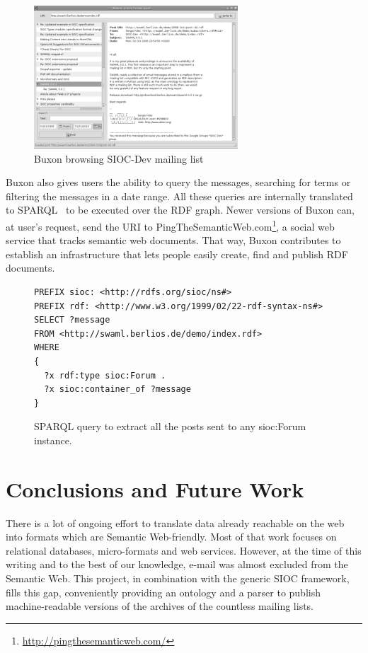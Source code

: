\documentclass{llncs}
\begin{document}
\begin{figure}[ht]
 \centering
 \includegraphics[bb=0 0 288 202]{images/buxon.png}
 \caption{\label{fig:buxon}Buxon browsing SIOC-Dev mailing list}
\end{figure}

Buxon also gives users the ability to query the messages, searching
for terms or filtering the messages in a date range. All these queries
are internally translated to SPARQL~\cite{SPARQLProtocol} to be executed
over the RDF graph. Newer versions of Buxon can, at user's request, send 
the URI to PingTheSemanticWeb.com\footnote{\url{http://pingthesemanticweb.com/}}, 
a social web service that tracks semantic web documents. That way, Buxon
contributes to establish an infrastructure that lets people easily create, 
find and publish RDF documents.

\begin{figure}[ht]
\lstset{language=SPARQL}
\begin{lstlisting}
PREFIX sioc: <http://rdfs.org/sioc/ns#>
PREFIX rdf: <http://www.w3.org/1999/02/22-rdf-syntax-ns#>
SELECT ?message
FROM <http://swaml.berlios.de/demo/index.rdf>
WHERE
{
  ?x rdf:type sioc:Forum .
  ?x sioc:container_of ?message
}
\end{lstlisting}
\caption{SPARQL query to extract all the posts sent to any \textsf{sioc:Forum} instance.}
\label{fig:sparqlquery}
\end{figure}

\section{\label{sec:conclusions}Conclusions and Future Work}

There is a lot of ongoing effort to translate data already reachable
on the web into formats which are Semantic Web-friendly. Most of that 
work focuses on relational databases, micro-formats and web services. 
However, at the time of this writing and to the best of our knowledge, 
e-mail was almost excluded from the Semantic Web. This project, in 
combination with the generic SIOC framework, fills this gap, conveniently 
providing an ontology and a parser to publish machine-readable versions 
of the archives of the countless mailing lists.
\end{document}
